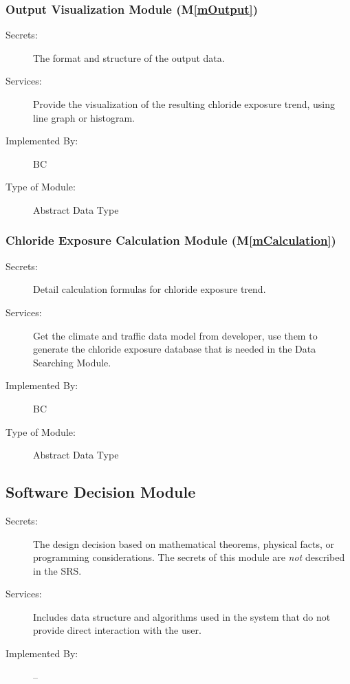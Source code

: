 \documentclass[12pt, titlepage]{article}
\newcommand{\mref}[1]{M\ref{#1}}
\begin{document}
\subsubsection{Output Visualization Module (\mref{mOutput})}
\begin{description}
\item[Secrets:] The format and structure of the output data.
\item[Services:] Provide the visualization of the resulting chloride exposure trend, using line graph or histogram. 
\item[Implemented By:] BC
\item[Type of Module:] Abstract Data Type
\end{description}

\subsubsection{Chloride Exposure Calculation Module (\mref{mCalculation})}
\begin{description}
\item[Secrets:] Detail calculation formulas for chloride exposure trend.
\item[Services:] Get the climate and traffic data model from developer, use them to generate the chloride exposure database that is needed in the Data Searching Module.
\item[Implemented By:] BC
\item[Type of Module:] Abstract Data Type
\end{description}

\subsection{Software Decision Module}

\begin{description}
\item[Secrets:] The design decision based on mathematical theorems, physical
  facts, or programming considerations. The secrets of this module are
  \emph{not} described in the SRS.
\item[Services:] Includes data structure and algorithms used in the system that
  do not provide direct interaction with the user. 
\item[Implemented By:] --
\end{description}
\end{document}
